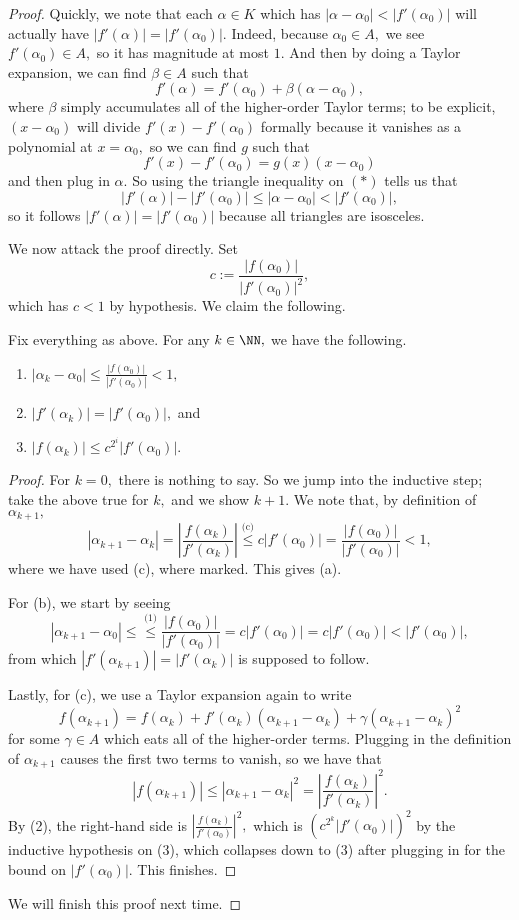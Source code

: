 \begin{proof}
	Quickly, we note that each $\alpha\in K$ which has $|\alpha-\alpha_0|<|f'(\alpha_0)|$ will actually have $|f'(\alpha)|=|f'(\alpha_0)|.$ Indeed, because $\alpha_0\in A,$ we see $f'(\alpha_0)\in A,$ so it has magnitude at most $1.$ And then by doing a Taylor expansion, we can find $\beta\in A$ such that
	\[f'(\alpha)=f'(\alpha_0)+\beta(\alpha-\alpha_0),\tag{$*$}\]
	where $\beta$ simply accumulates all of the higher-order Taylor terms; to be explicit, $(x-\alpha_0)$ will divide $f'(x)-f'(\alpha_0)$ formally because it vanishes as a polynomial at $x=\alpha_0,$ so we can find $g$ such that
	\[f'(x)-f'(\alpha_0)=g(x)(x-\alpha_0)\]
	and then plug in $\alpha.$ So using the triangle inequality on $(*)$ tells us that
	\[|f'(\alpha)|-|f'(\alpha_0)|\le|\alpha-\alpha_0|<|f'(\alpha_0)|,\]
	so it follows $|f'(\alpha)|=|f'(\alpha_0)|$ because all triangles are isosceles.

	We now attack the proof directly. Set
	\[c:=\frac{|f(\alpha_0)|}{|f'(\alpha_0)|^2},\]
	which has $c<1$ by hypothesis. We claim the following.
	\begin{lemma}
		Fix everything as above. For any $k\in\NN,$ we have the following.
		\begin{enumerate}[label=(\alph*)]
			\item $|\alpha_k-\alpha_0|\le\frac{|f(\alpha_0)|}{|f'(\alpha_0)|}<1,$
			\item $|f'(\alpha_k)|=|f'(\alpha_0)|,$ and
			\item $|f(\alpha_k)|\le c^{2^i}|f'(\alpha_0)|.$
		\end{enumerate}
	\end{lemma}
	\begin{proof}
		For $k=0,$ there is nothing to say. So we jump into the inductive step; take the above true for $k,$ and we show $k+1.$ We note that, by definition of $\alpha_{k+1},$
		\[|\alpha_{k+1}-\alpha_k|=\left|\frac{f(\alpha_k)}{f'(\alpha_k)}\right|\stackrel{\text{(c)}}\le c|f'(\alpha_0)|=\frac{|f(\alpha_0)|}{|f'(\alpha_0)|}<1,\]
		where we have used (c), where marked. This gives (a).

		For (b), we start by seeing
		\[|\alpha_{k+1}-\alpha_0|\le\stackrel{\text{(1)}}\le\frac{|f(\alpha_0)|}{|f'(\alpha_0)|}=c|f'(\alpha_0)|=c|f'(\alpha_0)|<|f'(\alpha_0)|,\]
		from which $|f'(\alpha_{k+1})|=|f'(\alpha_k)|$ is supposed to follow.

		Lastly, for (c), we use a Taylor expansion again to write
		\[f(\alpha_{k+1})=f(\alpha_k)+f'(\alpha_k)(\alpha_{k+1}-\alpha_k)+\gamma(\alpha_{k+1}-\alpha_k)^2\]
		for some $\gamma\in A$ which eats all of the higher-order terms. Plugging in the definition of $\alpha_{k+1}$ causes the first two terms to vanish, so we have that
		\[|f(\alpha_{k+1})|\le|\alpha_{k+1}-\alpha_k|^2=\left|\frac{f(\alpha_k)}{f'(\alpha_k)}\right|^2.\]
		By (2), the right-hand side is $\left|\frac{f(\alpha_k)}{f'(\alpha_0)}\right|^2,$ which is $\left(c^{2^k}|f'(\alpha_0)|\right)^2$ by the inductive hypothesis on (3), which collapses down to (3) after plugging in for the bound on $|f'(\alpha_0)|.$ This finishes.
		\qedhere
	\end{proof}
	We will finish this proof next time.
\end{proof}